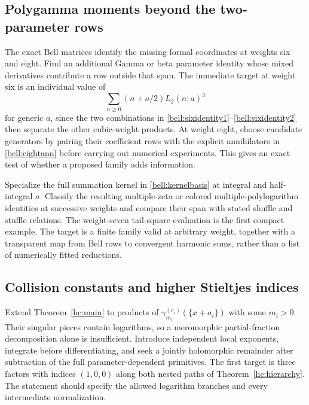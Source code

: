 \subsection{Polygamma moments beyond the two-parameter rows}

\begin{question}
The exact Bell matrices identify the missing formal coordinates at
weights six and eight. Find an additional Gamma or beta parameter
identity whose mixed derivatives contribute a row outside that span.
The immediate target at weight six is an individual value of
\[
 \sum_{n\ge0}(n+a/2)L_2(n;a)^3
\]
for generic $a$, since the two combinations in
\eqref{bell:sixidentity1}--\eqref{bell:sixidentity2} then separate
the other cubic-weight products. At weight eight, choose candidate
generators by pairing their coefficient rows with the explicit
annihilators in \eqref{bell:eightann} before carrying out numerical
experiments. This gives an exact test of whether a proposed family
adds information.
\end{question}

\begin{question}
Specialize the full summation kernel in
\eqref{bell:kernelbasis} at integral and half-integral $a$.
Classify the resulting multiple-zeta or colored multiple-polylogarithm
identities at successive weights and compare their span with stated
shuffle and stuffle relations. The weight-seven tail-square
evaluation is the first compact example. The target is a finite
family valid at arbitrary weight, together with a transparent map
from Bell rows to convergent harmonic sums, rather than a list of
numerically fitted reductions.
\end{question}

\subsection{Collision constants and higher Stieltjes indices}

\begin{question}
Extend Theorem~\ref{hc:main} to products of
$\gamma_{m_i}^{(r_i)}(\{x+a_i\})$ with some $m_i>0$.
Their singular pieces contain logarithms, so a meromorphic
partial-fraction decomposition alone is insufficient. Introduce
independent local exponents, integrate before differentiating, and
seek a jointly holomorphic remainder after subtraction of the full
parameter-dependent primitives. The first target is three factors
with indices $(1,0,0)$ along both nested paths of
Theorem~\ref{hc:hierarchy}. The statement should specify the
allowed logarithm branches and every intermediate normalization.
\end{question}

